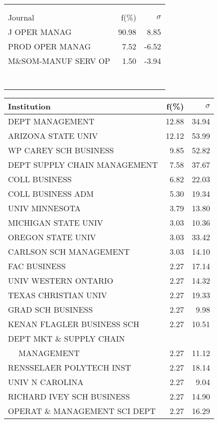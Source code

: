 \documentclass[a4paper,11pt]{report}
\begin{document}
\begin{landscape}
\begin{table}[!ht]
{\begin{tabular}{|l r  r|}
 &  & \\
 &  & \\
\hline
\hline
Journal & f(\%) & $\sigma$\\
\hline
J OPER MANAG & 90.98 & 8.85\\
PROD OPER MANAG & 7.52 & -6.52\\
M\&SOM-MANUF SERV OP & 1.50 & -3.94\\
 &  & \\
 &  & \\
 &  & \\
 &  & \\
 &  & \\
 &  & \\
 &  & \\
\hline
\end{tabular}
}
{\scriptsize\begin{tabular}{|l r r|}
\hline
Institution & f(\%) & $\sigma$\\
\hline
DEPT MANAGEMENT & 12.88 & 34.94\\
ARIZONA STATE UNIV & 12.12 & 53.99\\
WP CAREY SCH BUSINESS & 9.85 & 52.82\\
DEPT SUPPLY CHAIN MANAGEMENT & 7.58 & 37.67\\
COLL BUSINESS & 6.82 & 22.03\\
COLL BUSINESS ADM & 5.30 & 19.34\\
UNIV MINNESOTA & 3.79 & 13.80\\
MICHIGAN STATE UNIV & 3.03 & 10.36\\
OREGON STATE UNIV & 3.03 & 33.42\\
CARLSON SCH MANAGEMENT & 3.03 & 14.10\\
FAC BUSINESS & 2.27 & 17.14\\
UNIV WESTERN ONTARIO & 2.27 & 14.32\\
TEXAS CHRISTIAN UNIV & 2.27 & 19.33\\
GRAD SCH BUSINESS & 2.27 & 9.98\\
KENAN FLAGLER BUSINESS SCH & 2.27 & 10.51\\
DEPT MKT \& SUPPLY CHAIN &  & \\
$\quad$ MANAGEMENT & 2.27 & 11.12\\
RENSSELAER POLYTECH INST & 2.27 & 18.14\\
UNIV N CAROLINA & 2.27 & 9.04\\
RICHARD IVEY SCH BUSINESS & 2.27 & 14.90\\
OPERAT \& MANAGEMENT SCI DEPT & 2.27 & 16.29\\

\end{tabular}}
\end{table}
\end{landscape}
\end{document}
